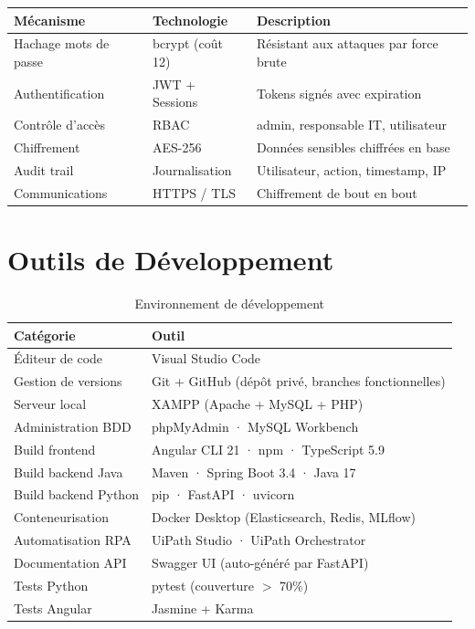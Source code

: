\documentclass[12pt,a4paper]{report}
\begin{document}
\begin{table}[H]
\centering
\begin{tabularx}{\textwidth}{|l|l|X|}
\hline
\textbf{Mécanisme} & \textbf{Technologie} & \textbf{Description} \\
\hline
Hachage mots de passe & bcrypt (coût 12) & Résistant aux attaques par force brute \\
\hline
Authentification & JWT + Sessions & Tokens signés avec expiration \\
\hline
Contrôle d'accès & RBAC & admin, responsable IT, utilisateur \\
\hline
Chiffrement & AES-256 & Données sensibles chiffrées en base \\
\hline
Audit trail & Journalisation & Utilisateur, action, timestamp, IP \\
\hline
Communications & HTTPS / TLS & Chiffrement de bout en bout \\
\hline
\end{tabularx}
\end{table}

\section{Outils de Développement}

\begin{table}[H]
\centering
\caption{Environnement de développement}
\begin{tabularx}{\textwidth}{|l|X|}
\hline
\textbf{Catégorie} & \textbf{Outil} \\
\hline
Éditeur de code & Visual Studio Code \\
\hline
Gestion de versions & Git + GitHub (dépôt privé, branches fonctionnelles) \\
\hline
Serveur local & XAMPP (Apache + MySQL + PHP) \\
\hline
Administration BDD & phpMyAdmin · MySQL Workbench \\
\hline
Build frontend & Angular CLI 21 · npm · TypeScript 5.9 \\
\hline
Build backend Java & Maven · Spring Boot 3.4 · Java 17 \\
\hline
Build backend Python & pip · FastAPI · uvicorn \\
\hline
Conteneurisation & Docker Desktop (Elasticsearch, Redis, MLflow) \\
\hline
Automatisation RPA & UiPath Studio · UiPath Orchestrator \\
\hline
Documentation API & Swagger UI (auto-généré par FastAPI) \\
\hline
Tests Python & pytest (couverture $>$ 70\%) \\
\hline
Tests Angular & Jasmine + Karma \\
\hline
\end{tabularx}
\end{table}
\end{document}
